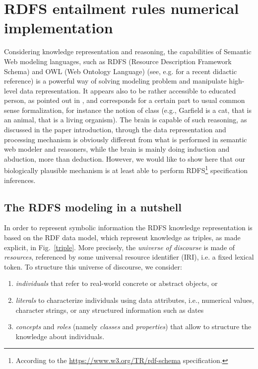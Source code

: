 
\section{RDFS entailment rules numerical implementation} \label{RDFS-entailment-rules}

Considering knowledge representation and reasoning, the capabilities of Semantic Web modeling languages, such as RDFS (Resource Description Framework Schema) and OWL (Web Ontology Language) (see, e.g. \cite{allemang_semantic_2020} for a recent didactic reference) is a powerful way of solving modeling problem and manipulate high-level data representation. It appears also to be rather accessible to educated person, as pointed out in \cite{allemang_semantic_2020}, and corresponds for a certain part to usual common sense formalization, for instance the notion of class (e.g., Garfield is a cat, that is an animal, that is a living organism). The brain is capable of such reasoning, as discussed in the paper introduction, through the data representation and processing mechanism is obviously different from what is performed in semantic web modeler and reasoners, while the brain is mainly doing induction and abduction, more than deduction. However, we would like to show here that our biologically plausible mechanism is at least able to perform RDFS\footnote{According to the \url{ https://www.w3.org/TR/rdf-schema} specification.} specification inferences.

\subsection*{The RDFS modeling in a nutshell}

In order to represent symbolic information the RDFS knowledge representation is based on the RDF data model, which represent knowledge  as triples, as made explicit, in Fig.~\ref{triple}. More precisely, the \emph{universe of discourse} is made of \emph{resources}, referenced by some universal resource identifier (IRI), i.e. a fixed lexical token. To structure this universe of discourse, we consider: \begin{enumerate}[label=(\roman*)]
    \item \emph{individuals} that refer to real-world concrete or abstract objects, or 
    \item \emph{literals} to characterize individuals using data attributes, i.e., numerical values, character strings, or any structured information such as dates
    \item \emph{concepts} and \emph{roles} (namely \emph{classes} and \emph{properties}) that allow to structure the knowledge about individuals.
\end{enumerate}

